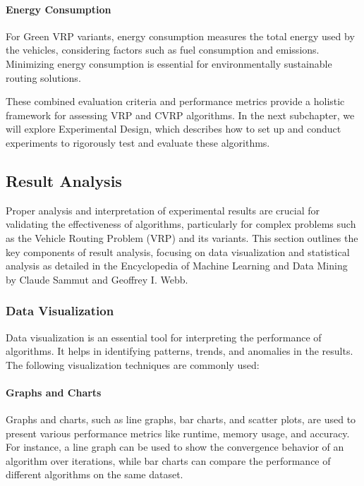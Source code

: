 \documentclass[
]{article}
\begin{document}
    \paragraph{Energy Consumption} For Green VRP variants, energy consumption measures the total energy used by the vehicles, considering factors such as fuel consumption and emissions. Minimizing energy consumption is essential for environmentally sustainable routing solutions.


    These combined evaluation criteria and performance metrics provide a holistic framework for assessing VRP and CVRP algorithms. In the next subchapter, we will explore Experimental Design, which describes how to set up and conduct experiments to rigorously test and evaluate these algorithms.

    \subsection{Result Analysis}\label{subsec:result-analysis}

    Proper analysis and interpretation of experimental results are crucial for validating the effectiveness of algorithms, particularly for complex problems such as the Vehicle Routing Problem (VRP) and its variants. This section outlines the key components of result analysis, focusing on data visualization and statistical analysis as detailed in the Encyclopedia of Machine Learning and Data Mining by Claude Sammut and Geoffrey I. Webb.

    \subsubsection{Data Visualization}

    Data visualization is an essential tool for interpreting the performance of algorithms. It helps in identifying patterns, trends, and anomalies in the results. The following visualization techniques are commonly used:

    \paragraph{Graphs and Charts}

    Graphs and charts, such as line graphs, bar charts, and scatter plots, are used to present various performance metrics like runtime, memory usage, and accuracy. For instance, a line graph can be used to show the convergence behavior of an algorithm over iterations, while bar charts can compare the performance of different algorithms on the same dataset.
\end{document}
